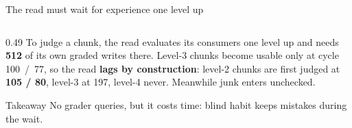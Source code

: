 \documentclass[aspectratio=169,11pt]{beamer}
\newcommand{\warmtext}[1]{\textcolor{gateorange}{\textbf{#1}}}
\begin{document}
\begin{frame}{The read must wait for experience one level up}
\begin{columns}[T]
\begin{column}{0.49\textwidth}
{\small To judge a chunk, the read evaluates its consumers one level up and needs \warmtext{512} of its own graded writes there. Level-3 chunks become usable only at cycle 100~/~77, so the read \textbf{lags by construction}: level-2 chunks are first judged at \textbf{105 / 80}, level-3 at 197, level-4 never. Meanwhile junk enters unchecked.}

\smallskip
\begin{alertblock}{Takeaway}
{\small No grader queries, but it costs time: blind habit keeps mistakes during the wait.}
\end{alertblock}
\end{column}


\end{columns}
\end{frame}
\end{document}
